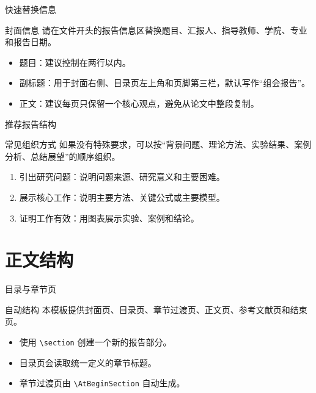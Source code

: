 \documentclass[12pt,aspectratio=43]{beamer}
\newcommand{\SUSTEmph}[1]{{\SUSTHei #1}}
\newcommand{\SUSTSectionTitleTwo}{正文结构}
\begin{document}
\begin{frame}{快速替换信息}
  \begin{block}{封面信息}
    请在文件开头的报告信息区替换题目、汇报人、指导教师、学院、专业和报告日期。
  \end{block}

  \begin{itemize}
    \item \SUSTEmph{题目}：建议控制在两行以内。
    \item \SUSTEmph{副标题}：用于封面右侧、目录页左上角和页脚第三栏，默认写作“组会报告”。
    \item \SUSTEmph{正文}：建议每页只保留一个核心观点，避免从论文中整段复制。
  \end{itemize}
\end{frame}

\begin{frame}{推荐报告结构}
  \begin{block}{常见组织方式}
    如果没有特殊要求，可以按“背景问题、理论方法、实验结果、案例分析、总结展望”的顺序组织。
  \end{block}

  \begin{enumerate}
    \item 引出研究问题：说明问题来源、研究意义和主要困难。
    \item 展示核心工作：说明主要方法、关键公式或主要模型。
    \item 证明工作有效：用图表展示实验、案例和结论。
  \end{enumerate}
\end{frame}

\section{\SUSTSectionTitleTwo}

\begin{frame}{目录与章节页}
  \begin{block}{自动结构}
    本模板提供封面页、目录页、章节过渡页、正文页、参考文献页和结束页。
  \end{block}

  \begin{itemize}
    \item 使用 \texttt{\textbackslash section} 创建一个新的报告部分。
    \item 目录页会读取统一定义的章节标题。
    \item 章节过渡页由 \texttt{\textbackslash AtBeginSection} 自动生成。
  \end{itemize}
\end{frame}
\end{document}
